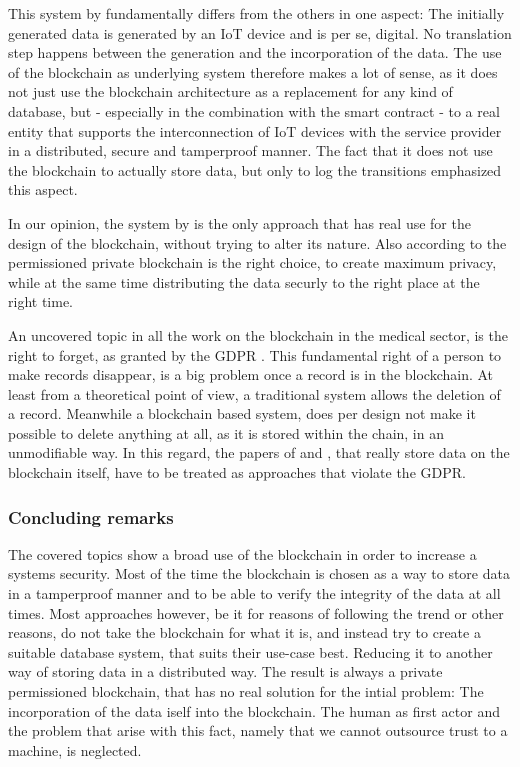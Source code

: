 This system by \cite{Baccarini2018} fundamentally differs from the others in one aspect: The initially generated data is generated by an IoT device and is per se, digital. No translation step happens between the generation and the incorporation of the data.
The use of the blockchain as underlying system therefore makes a lot of sense, as it does not just use the blockchain architecture as a replacement for any kind of database, but - especially in the combination with the smart contract - to a real entity that supports the interconnection of IoT devices with the service provider in a distributed, secure and tamperproof manner. The fact that it does not use the blockchain to actually store data, but only to log the transitions emphasized this aspect.

In our opinion, the system by \citeauthor{Baccarini2018} is the only approach that has real use for the design of the blockchain, without trying to alter its nature. Also according to \citeauthor{Wust2017} the permissioned private blockchain is the right choice, to create maximum privacy, while at the same time distributing the data securly to the right place at the right time.

An uncovered topic in all the work on the blockchain in the medical sector, is the right to forget, as granted by the GDPR \cite{EuropeanCommission2017}. This fundamental right of a person to make records disappear, is a big problem once a record is in the blockchain. At least from a theoretical point of view, a traditional system allows the deletion of a record. Meanwhile a blockchain based system, does per design not make it possible to delete anything at all, as it is stored within the chain, in an unmodifiable way. In this regard, the papers of \cite{Cao2019} and \cite{Azaria2016}, that really store data on the blockchain itself, have to be treated as approaches that violate the GDPR.

\subsubsection{Concluding remarks}

The covered topics show a broad use of the blockchain in order to increase a systems security. Most of the time the blockchain is chosen as a way to store data in a tamperproof manner and to be able to verify the integrity of the data at all times. 
Most approaches however, be it for reasons of following the trend or other reasons, do not take the blockchain for what it is, and instead try to create a suitable database system, that suits their use-case best. Reducing it to another way of storing data in a distributed way. The result is always a private permissioned blockchain, that has no real solution for the intial problem: The incorporation of the data iself into the blockchain. The human as first actor and the problem that arise with this fact, namely that we cannot outsource trust to a machine, is neglected.

